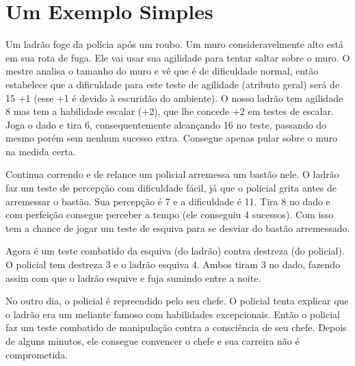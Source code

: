 \section{Um Exemplo Simples}

Um ladrão foge da polícia após um roubo. Um muro consideravelmente alto está em sua rota de fuga. Ele vai usar sua agilidade para tentar saltar sobre o muro. O mestre analisa o tamanho do muro e vê que é de dificuldade normal, então estabelece que a dificuldade para este teste de agilidade (atributo geral) será de 15 +1 (esse +1 é devido à escuridão do ambiente). O nosso ladrão tem agilidade 8 mas tem a habilidade escalar (+2), que lhe concede +2 em testes de escalar. Joga o dado e tira 6, consequentemente alcançando 16 no teste, passando do mesmo porém sem nenhum sucesso extra. Consegue apenas pular sobre o muro na medida certa. 

Continua correndo e de relance um policial arremessa um bastão nele. O ladrão faz um teste de percepção com dificuldade fácil, já que o policial grita antes de arremessar o bastão. Sua percepção é 7 e a dificuldade é 11. Tira 8 no dado e com perfeição consegue perceber a tempo (ele conseguiu 4 sucessos). Com isso tem a chance de jogar um teste de esquiva para se desviar do bastão arremessado.

Agora é um teste combatido da esquiva (do ladrão) contra destreza (do policial). O policial tem destreza 3 e o ladrão esquiva 4. Ambos tiram 3 no dado, fazendo assim com que o ladrão esquive e fuja sumindo entre a noite.

No outro dia, o policial é repreendido pelo seu chefe. O policial tenta explicar que o ladrão era um meliante famoso com habilidades excepcionais. Então o policial faz um teste combatido de manipulação contra a consciência de seu chefe. Depois de alguns minutos, ele consegue convencer o chefe e sua carreira não é comprometida.
